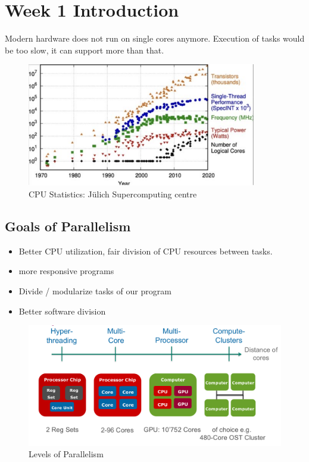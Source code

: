 \section{Week 1 Introduction}

Modern hardware does not run on single cores anymore. Execution of tasks would be too slow, it can support more than that.

\begin{figure}[H]
    \centering
    \includegraphics*[width=10cm]{res/01-stats.png}
    \caption{CPU Statistics: Jülich Supercomputing centre}
\end{figure}

\subsection*{Goals of Parallelism}

\begin{itemize}
  \item Better CPU utilization, fair division of CPU resources between tasks.
  \item more responsive programs 
  \item Divide / modularize tasks of our program 
  \item Better software division
\end{itemize}

\begin{figure}[H]
  \centering
  \includegraphics[width=12cm]{res/01-levels-of-parallelism}
  \caption{Levels of Parallelism}
\end{figure}

